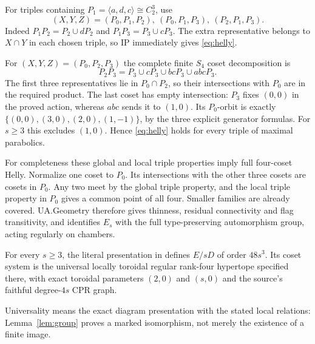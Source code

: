 For triples containing $P_1=\langle a,d,c\rangle\cong C_2^3$, use
\[
(X,Y,Z)=(P_0,P_1,P_2),\ (P_0,P_1,P_3),\ (P_2,P_1,P_3).
\]
Indeed $P_1P_2=P_2\cup dP_2$ and $P_1P_3=P_3\cup cP_3$.
The extra representative belongs to $X\cap Y$ in each chosen triple,
so IP immediately gives \eqref{eq:helly}.

For $(X,Y,Z)=(P_0,P_2,P_3)$ the complete finite $S_4$ coset decomposition is
\[
P_2P_3=P_3\cup cP_3\cup bcP_3\cup abcP_3.
\]
The first three representatives lie in $P_0\cap P_2$, so their
intersections with $P_0$ are in the required product. The last coset has
empty intersection: $P_3$ fixes $(0,0)$ in the proved action, whereas
$abc$ sends it to $(1,0)$. Its $P_0$-orbit is exactly
$\{(0,0),(3,0),(2,0),(1,-1)\}$, by the three explicit generator formulas.
For $s\ge3$ this excludes $(1,0)$. Hence \eqref{eq:helly} holds for every
triple of maximal parabolics.

For completeness these global and local triple properties imply full
four-coset Helly. Normalize one coset to $P_0$. Its intersections with
the other three cosets are cosets in $P_0$. Any two meet by the global
triple property, and the local triple property in $P_0$ gives a common
point of all four. Smaller families are already covered. UA.Geometry
therefore gives thinness, residual connectivity and flag transitivity,
and identifies $E_s$ with the full type-preserving automorphism group,
acting regularly on chambers.
\begin{theorem}
For every $s\ge3$, the literal presentation in \cite[Theorem~3.1]{source}
defines $E/sD$ of order $48s^3$. Its coset system is the universal locally
toroidal regular rank-four hypertope specified there, with exact toroidal
parameters $(2,0)$ and $(s,0)$ and the source's faithful degree-$4s$ CPR graph.
\end{theorem}
Universality means the exact diagram presentation with the stated local
relations: Lemma~\ref{lem:group} proves a marked isomorphism, not merely
the existence of a finite image.
